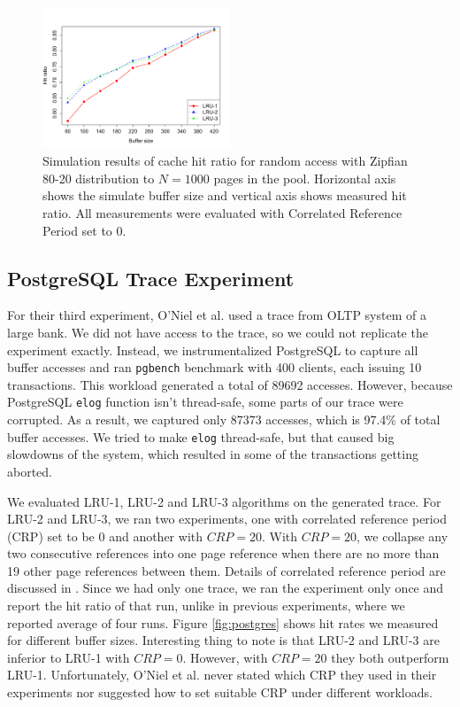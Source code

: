 \begin{figure}[t!]
    \centering
	\includegraphics[width=0.5\textwidth]{./figures/zipfian.pdf}
	\caption{Simulation results of cache hit ratio for random access with Zipfian 80-20 distribution to $N = 1000$ pages in the pool. Horizontal axis shows the simulate buffer size and vertical axis shows measured hit ratio. All measurements were evaluated with Correlated Reference Period set to 0.}
	\label{fig:zipfian}
\end{figure}


\subsection{PostgreSQL Trace Experiment}

For their third experiment, O'Niel et al. \cite{lruk} used a trace from OLTP system of a large bank. We did not have access to the trace, so we could not replicate the experiment exactly. Instead, we instrumentalized PostgreSQL to capture all buffer accesses and ran \texttt{pgbench} benchmark with 400 clients, each issuing 10 transactions. This workload generated a total of 89692 accesses. However, because PostgreSQL \texttt{elog} function isn't thread-safe, some parts of our trace were corrupted. As a result, we captured only 87373 accesses, which is 97.4\% of total buffer accesses. We tried to make \texttt{elog} thread-safe, but that caused big slowdowns of the system, which resulted in some of the transactions getting aborted.

We evaluated LRU-1, LRU-2 and LRU-3 algorithms on the generated trace. For LRU-2 and LRU-3, we ran two experiments, one with correlated reference period (CRP) set to be 0 and another with $CRP = 20$. With $CRP = 20$, we collapse any two consecutive references into one page reference when there are no more than 19 other page references between them. Details of correlated reference period are discussed in \cite{lruk}. Since we had only one trace, we ran the experiment only once and report the hit ratio of that run, unlike in previous experiments, where we reported average of four runs. Figure \ref{fig:postgres} shows hit rates we measured for different buffer sizes. Interesting thing to note is that LRU-2 and LRU-3 are inferior to LRU-1 with $CRP = 0$. However, with $CRP = 20$ they both outperform LRU-1. Unfortunately, O'Niel et al. \cite{lruk} never stated which CRP they used in their experiments nor suggested how to set suitable CRP under different workloads.

